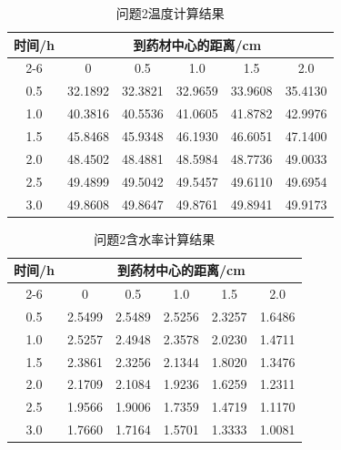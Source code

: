\begin{table}[H]\centering\small
\caption{问题2温度计算结果}\label{tab:q2_temperature}
\begin{tabular}{cccccc}
\toprule
\multirow{2}{*}{时间/h} & \multicolumn{5}{c}{到药材中心的距离/cm}\\\cmidrule(lr){2-6} & 0 & 0.5 & 1.0 & 1.5 & 2.0\\\midrule
0.5 & 32.1892 & 32.3821 & 32.9659 & 33.9608 & 35.4130\\
1.0 & 40.3816 & 40.5536 & 41.0605 & 41.8782 & 42.9976\\
1.5 & 45.8468 & 45.9348 & 46.1930 & 46.6051 & 47.1400\\
2.0 & 48.4502 & 48.4881 & 48.5984 & 48.7736 & 49.0033\\
2.5 & 49.4899 & 49.5042 & 49.5457 & 49.6110 & 49.6954\\
3.0 & 49.8608 & 49.8647 & 49.8761 & 49.8941 & 49.9173\\
\bottomrule\end{tabular}\end{table}
\begin{table}[H]\centering\small
\caption{问题2含水率计算结果}\label{tab:q2_moisture}
\begin{tabular}{cccccc}
\toprule
\multirow{2}{*}{时间/h} & \multicolumn{5}{c}{到药材中心的距离/cm}\\\cmidrule(lr){2-6} & 0 & 0.5 & 1.0 & 1.5 & 2.0\\\midrule
0.5 & 2.5499 & 2.5489 & 2.5256 & 2.3257 & 1.6486\\
1.0 & 2.5257 & 2.4948 & 2.3578 & 2.0230 & 1.4711\\
1.5 & 2.3861 & 2.3256 & 2.1344 & 1.8020 & 1.3476\\
2.0 & 2.1709 & 2.1084 & 1.9236 & 1.6259 & 1.2311\\
2.5 & 1.9566 & 1.9006 & 1.7359 & 1.4719 & 1.1170\\
3.0 & 1.7660 & 1.7164 & 1.5701 & 1.3333 & 1.0081\\
\bottomrule\end{tabular}\end{table}
